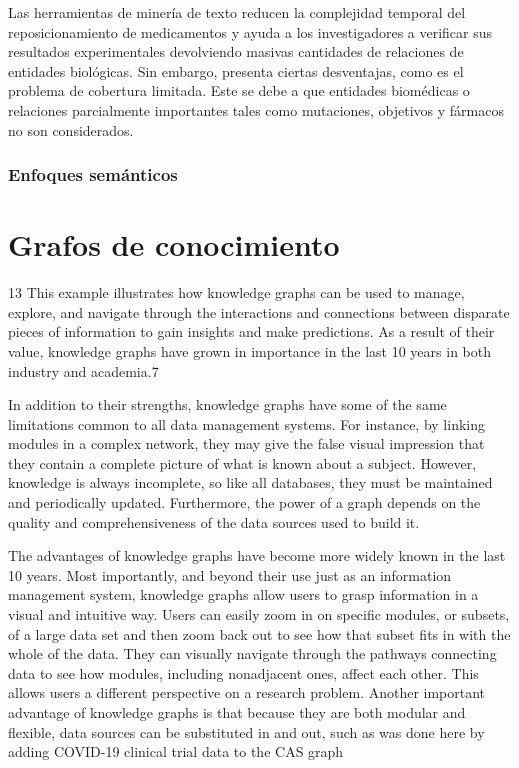 Las herramientas de minería de texto reducen la complejidad temporal del reposicionamiento de medicamentos y ayuda a los investigadores a verificar sus resultados experimentales devolviendo masivas cantidades de relaciones de entidades biológicas. Sin embargo, presenta ciertas desventajas, como es el problema de cobertura limitada. Este se debe a que entidades biomédicas o relaciones parcialmente importantes tales como mutaciones, objetivos y fármacos no son considerados.

\subsubsection{Enfoques semánticos}


\section{Grafos de conocimiento}

13
 This example illustrates how knowledge graphs can be
used to manage, explore, and navigate through the interactions
and connections between disparate pieces of information to
gain insights and make predictions. As a result of their value,
knowledge graphs have grown in importance in the last 10
years in both industry and academia.7

In addition to their strengths, knowledge graphs have some
of the same limitations common to all data management
systems. For instance, by linking modules in a complex
network, they may give the false visual impression that they
contain a complete picture of what is known about a subject.
However, knowledge is always incomplete, so like all databases,
they must be maintained and periodically updated. Furthermore, the power of a graph depends on the quality and
comprehensiveness of the data sources used to build it.

The advantages of knowledge graphs have become more widely known in the last 10 years. Most importantly, and beyond their use just as an information management system, knowledge graphs allow users to grasp information in a visual and intuitive way. Users can easily zoom in on specific modules, or subsets, of a large data set and then zoom back out to see how that subset fits in with the whole of the data. They can visually navigate through the pathways connecting data to see how modules, including nonadjacent ones, affect each other. This allows users a different perspective on a research problem. Another important advantage of knowledge graphs is that because they are both modular and flexible, data sources can be substituted in and out, such as was done here by adding COVID-19 clinical trial data to the CAS graph


